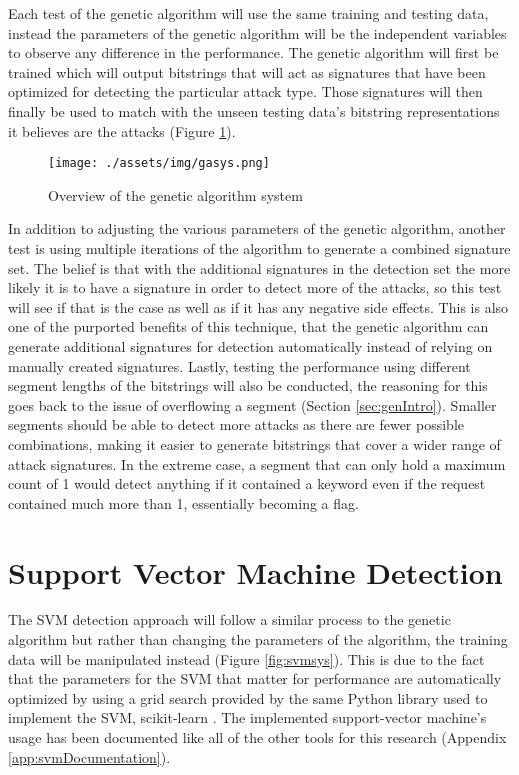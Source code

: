 Each test of the genetic algorithm will use the same training and testing data, instead the parameters of the genetic algorithm will be the independent variables to observe any difference in the performance.  The genetic algorithm will first be trained which will output bitstrings that will act as signatures that have been optimized for detecting the particular attack type. Those signatures will then finally be used to match with the unseen testing data's bitstring representations it believes are the attacks (Figure \ref{fig:gasys}).

\begin{figure}
	\texttt{[image: ./assets/img/gasys.png]}
	\caption{Overview of the genetic algorithm system}
	\label{fig:gasys}
\end{figure}

In addition to adjusting the various parameters of the genetic algorithm, another test is using multiple iterations of the algorithm to generate a combined signature set.  The belief is that with the additional signatures in the detection set the more likely it is to have a signature in order to detect more of the attacks, so this test will see if that is the case as well as if it has any negative side effects.  This is also one of the purported benefits of this technique, that the genetic algorithm can generate additional signatures for detection automatically instead of relying on manually created signatures.  Lastly, testing the performance using different segment lengths of the bitstrings will also be conducted, the reasoning for this goes back to the issue of overflowing a segment (Section \ref{sec:genIntro}).  Smaller segments should be able to detect more attacks as there are fewer possible combinations, making it easier to generate bitstrings that cover a wider range of attack signatures.  In the extreme case, a segment that can only hold a maximum count of 1 would detect anything if it contained a keyword even if the request contained much more than 1, essentially becoming a flag.

\section{Support Vector Machine Detection}

The SVM detection approach will follow a similar process to the genetic algorithm but rather than changing the parameters of the algorithm, the training data will be manipulated instead (Figure \ref{fig:svmsys}).  This is due to the fact that the parameters for the SVM that matter for performance are automatically optimized by using a grid search provided by the same Python library used to implement the SVM, scikit-learn \cite{scikit-learn}.  The implemented support-vector machine's usage has been documented like all of the other tools for this research (Appendix \ref{app:svmDocumentation}).

